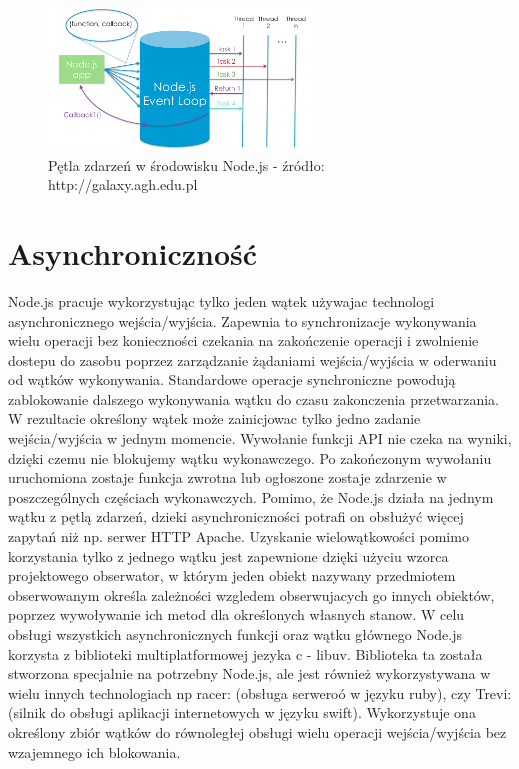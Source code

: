 \documentclass[12pt]{report}
\begin{document}
\begin{figure}[!t]
\centering
\includegraphics[width=7cm]{eventLoop.png} 
\caption{Pętla zdarzeń w środowisku Node.js - źródło: http://galaxy.agh.edu.pl}
\end{figure}

\section{Asynchroniczność}
Node.js pracuje wykorzystując tylko jeden wątek używajac technologi asynchronicznego wejścia/wyjścia. 
Zapewnia to synchronizacje wykonywania wielu operacji bez konieczności czekania na zakończenie operacji i zwolnienie dostepu do zasobu poprzez zarządzanie żądaniami wejścia/wyjścia w oderwaniu od wątków wykonywania. 
Standardowe operacje synchroniczne powodują zablokowanie dalszego wykonywania wątku do czasu zakonczenia przetwarzania. 
W rezultacie określony wątek może zainicjowac tylko jedno zadanie wejścia/wyjścia w jednym momencie. 
Wywołanie funkcji API nie czeka na wyniki, dzięki czemu nie blokujemy wątku wykonawczego. 
Po zakończonym wywołaniu uruchomiona zostaje funkcja zwrotna lub ogłoszone zostaje zdarzenie w poszczególnych częściach wykonawczych. 
Pomimo, że Node.js działa na jednym wątku z pętlą zdarzeń, dzieki asynchroniczności potrafi on obsłużyć więcej zapytań niż np. serwer HTTP Apache. 
Uzyskanie wielowątkowości pomimo korzystania tylko z jednego wątku jest zapewnione dzięki użyciu wzorca projektowego obserwator, w którym jeden obiekt nazywany przedmiotem obserwowanym określa zależności wzgledem obserwujacych go innych obiektów, poprzez wywoływanie ich metod dla określonych własnych stanow. 
W celu obsługi wszystkich asynchronicznych funkcji oraz wątku głównego Node.js korzysta z biblioteki multiplatformowej jezyka c - libuv. 
Biblioteka ta została stworzona specjalnie na potrzebny Node.js, ale jest również wykorzystywana w wielu innych technologiach np racer: (obsługa serweroó w języku ruby), czy Trevi: (silnik do obsługi aplikacji internetowych w języku swift). 
Wykorzystuje ona określony zbiór wątków do równoległej obsługi wielu operacji wejścia/wyjścia bez wzajemnego ich blokowania. 
\end{document}
